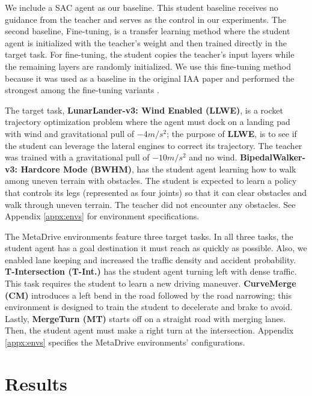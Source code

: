 \documentclass{article} %
\begin{document}
We include a SAC agent as our baseline. This student baseline receives no guidance from the teacher and serves as the control in our experiments. The second baseline, Fine-tuning, is a transfer learning method where the student agent is initialized with the teacher's weight and then trained directly in the target task. For fine-tuning, the student copies the teacher's input layers while the remaining layers are randomly initialized. We use this fine-tuning method because it was used as a baseline in the original IAA paper and performed the strongest among the fine-tuning variants \cite{campbell2023introspective}. 

The target task, \textbf{LunarLander-v3: Wind Enabled (LLWE)}, is a rocket trajectory optimization problem where the agent must dock on a landing pad with wind and gravitational pull of $-4m/s^2$; the purpose of \textbf{LLWE}, is to see if the student can leverage the lateral engines to correct its trajectory. The teacher was trained with a gravitational pull of $-10m/s^2$ and no wind. \textbf{BipedalWalker-v3: Hardcore Mode (BWHM)}, has the student agent learning how to walk among uneven terrain with obstacles. The student is expected to learn a policy that controls its legs (represented as four joints) so that it can clear obstacles and walk through uneven terrain. The teacher did not encounter any obstacles. See Appendix \ref{appx:envs} for environment specifications.

The MetaDrive environments feature three target tasks. In all three tasks, the student agent has a goal destination it must reach as quickly as possible. Also, we enabled lane keeping and increased the traffic density and accident probability. \textbf{T-Intersection (T-Int.)} has the student agent turning left with dense traffic. This task requires the student to learn a new driving maneuver. \textbf{CurveMerge (CM)} introduces a left bend in the road followed by the road narrowing; this environment is designed to train the student to decelerate and brake to avoid. Lastly, \textbf{MergeTurn (MT)} starts off on a straight road with merging lanes. Then, the student agent must make a right turn at the intersection. Appendix \ref{appx:envs} specifies the MetaDrive environments' configurations.



\section{Results}
\label{sec:results}
\end{document}
